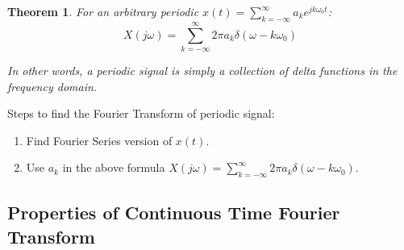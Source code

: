 \documentclass[a4paper,12pt]{report}
\newtheorem{theorem}{Theorem}
\begin{document}
\begin{theorem}
For an arbitrary periodic $x(t) = \sum_{k = -\infty}^{\infty} a_k e^{jk\omega_0 t}$:
\begin{equation}
X(j\omega) = \sum_{k = -\infty}^{\infty} 2\pi a_k \delta(\omega - k\omega_0)
\end{equation}

In other words, a periodic signal is simply a collection of delta functions in the frequency domain. 
\end{theorem}

Steps to find the Fourier Transform of periodic signal: 
\begin{enumerate}
\item Find Fourier Series version of $x(t)$.
\item Use $a_k$ in the above formula $X(j\omega) = \sum_{k=-\infty}^{\infty} 2\pi a_k \delta(\omega - k\omega_0)$.
\end{enumerate}



\subsection{Properties of Continuous Time Fourier Transform}
\end{document}
